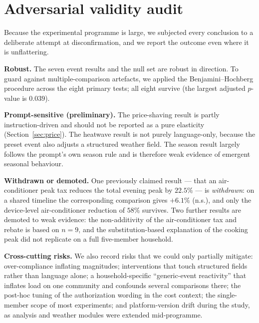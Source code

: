 \documentclass[11pt]{article}
\begin{document}
\section{Adversarial validity audit}
\label{sec:audit}
Because the experimental programme is large, we subjected every conclusion to a deliberate attempt at
disconfirmation, and we report the outcome even where it is unflattering.

\noindent\textbf{Robust.} The seven event results and the null set are robust in direction. To guard
against multiple-comparison artefacts, we applied the Benjamini--Hochberg procedure across the eight
primary tests; all eight survive (the largest adjusted $p$-value is $0.039$).

\noindent\textbf{Prompt-sensitive (preliminary).} The price-shaving result is partly instruction-driven
and should not be reported as a pure elasticity (Section~\ref{sec:price}). The heatwave result is not
purely language-only, because the preset event also adjusts a structured weather field. The season result
largely follows the prompt's own season rule and is therefore weak evidence of emergent seasonal
behaviour.

\noindent\textbf{Withdrawn or demoted.} One previously claimed result --- that an air-conditioner peak tax
reduces the total evening peak by $22.5\%$ --- is \emph{withdrawn}: on a shared timeline the corresponding
comparison gives $+6.1\%$ (n.s.), and only the device-level air-conditioner reduction of $58\%$ survives.
Two further results are demoted to weak evidence: the non-additivity of the air-conditioner tax and rebate
is based on $n=9$, and the substitution-based explanation of the cooking peak did not replicate on a
full five-member household.

\noindent\textbf{Cross-cutting risks.} We also record risks that we could only partially mitigate:
over-compliance inflating magnitudes; interventions that touch structured fields rather than language
alone; a household-specific ``generic-event reactivity'' that inflates load on one community and confounds
several comparisons there; the post-hoc tuning of the authorization wording in the cost context; the
single-member scope of most experiments; and platform-version drift during the study, as analysis and
weather modules were extended mid-programme.

\end{document}

